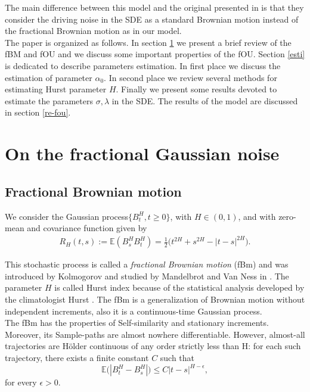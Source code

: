 \documentclass[smallextended]{svjour3}
\newcommand{\E}{\mathbb{E}}
\begin{document}
The main difference between this model and the original presented
in \cite{mi-pr} is that they consider the driving noise in the SDE as a standard
Brownian motion instead of the fractional Brownian motion as in our model.\\



The paper is organized as follows. In section \ref{fgn} we present a brief 
review of
the fBM and fOU and we discuss some important properties of the fOU. Section 
\ref{esti}
is dedicated to describe parameters estimation.
In first place we discuss the estimation of parameter $\alpha_0$. In second 
place we review several
methods for estimating  Hurst parameter
$H$. Finally we present some results devoted to estimate the parameters
$\sigma,\lambda$ in the SDE. The results of the
model are discussed in section \ref{re-fou}.\\


\section{On the fractional Gaussian noise}
\label{fgn}

\subsection{Fractional Brownian motion}

We consider the Gaussian process$\{B_t^H,t\ge 0\}$, with $H\in (0,1)$,  and 
with zero-mean and covariance function given by
\begin{align}
R_H(t,s):=\E(B_s^HB_t^H)= \tfrac{1}{2}\big(t^{2H}+s^{2H}-|t-s|^{2H} 
\big).\label{s1.1}
\end{align}

This stochastic process  is called a {\it fractional Brownian motion} (fBm) and 
was introduced by Kolmogorov \cite{ko}
and studied by Mandelbrot and Van Ness in \cite{ma-va}. The parameter $H$ is 
called Hurst index because of
the statistical analysis developed by the climatologist Hurst \cite{hu}.
The fBm is a generalization of Brownian motion without independent increments, 
also it is a continuous-time Gaussian process. \\


The fBm has the properties of Self-similarity and stationary increments. 
Moreover, its Sample-paths are almost nowhere differentiable. However, 
almost-all trajectories are
H\"older continuous of any order strictly less than H: for each such 
trajectory, there exists a finite constant $C$ such that
\[
\E\big(|B_t^H-B_s^H|\big) \le C |t-s|^{H-\epsilon},
\]
for every $\epsilon > 0$.
\end{document}
